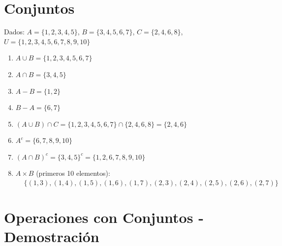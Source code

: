 \documentclass[12pt,a4paper]{article}
\begin{document}
\section{Conjuntos}

Dados: $A = \{1, 2, 3, 4, 5\}$, $B = \{3, 4, 5, 6, 7\}$, $C = \{2, 4, 6, 8\}$, $U = \{1, 2, 3, 4, 5, 6, 7, 8, 9, 10\}$

\begin{enumerate}
    \item $A \cup B = \{1, 2, 3, 4, 5, 6, 7\}$
    
    \item $A \cap B = \{3, 4, 5\}$
    
    \item $A - B = \{1, 2\}$
    
    \item $B - A = \{6, 7\}$
    
    \item $(A \cup B) \cap C = \{1, 2, 3, 4, 5, 6, 7\} \cap \{2, 4, 6, 8\} = \{2, 4, 6\}$
    
    \item $A^c = \{6, 7, 8, 9, 10\}$
    
    \item $(A \cap B)^c = \{3, 4, 5\}^c = \{1, 2, 6, 7, 8, 9, 10\}$
    
    \item $A \times B$ (primeros 10 elementos):
    \begin{align*}
        &\{(1,3), (1,4), (1,5), (1,6), (1,7), (2,3), (2,4), (2,5), (2,6), (2,7)\}
    \end{align*}
\end{enumerate}

\section{Operaciones con Conjuntos - Demostración}
\end{document}
